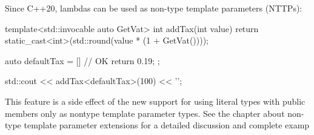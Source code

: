 Since C++20, lambdas can be used as non-type template parameters (NTTPs):

\begin{cpp}
template<std::invocable auto GetVat>
int addTax(int value)
{
	return static_cast<int>(std::round(value * (1 + GetVat())));
}

auto defaultTax = [] { // OK
	return 0.19;
};

std::cout << addTax<defaultTax>(100) << '\n';
\end{cpp}

This feature is a side effect of the new support for using literal types with public members only as nontype template parameter types. See the chapter about non-type template parameter extensions for a detailed discussion and complete examp





